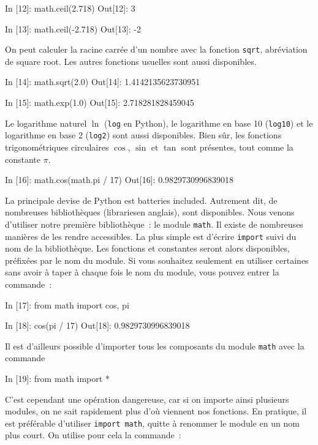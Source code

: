 \documentclass{magnolia}
\begin{document}
\begin{pythoncode}
In [12]: math.ceil(2.718)
Out[12]: 3

In [13]: math.ceil(-2.718)
Out[13]: -2
\end{pythoncode}

On peut calculer la racine carrée d'un nombre avec la fonction \verb_sqrt_,
abréviation de \og square root\fg. Les autres fonctions usuelles sont aussi disponibles.

\begin{pythoncode}
In [14]: math.sqrt(2.0)
Out[14]: 1.4142135623730951

In [15]: math.exp(1.0)
Out[15]: 2.718281828459045
\end{pythoncode}

\noindent Le logarithme naturel $\ln$ (\verb_log_ en Python), le logarithme en base 10 (\verb_log10_) et
le logarithme en base 2 (\verb_log2_) sont aussi disponibles. Bien sûr, les fonctions
trigonométriques circulaires $\cos$, $\sin$ et $\tan$ sont présentes, tout comme la
constante $\pi$.

\begin{pythoncode}
In [16]: math.cos(math.pi / 17)
Out[16]: 0.9829730996839018
\end{pythoncode}

La principale devise de Python est \og batteries included\fg. Autrement dit,
de nombreuses bibliothèques (\og libraries\fg en anglais), sont disponibles. Nous
venons d'utiliser notre première bibliothèque~: le module \verb_math_. Il existe de
nombreuses manières de les rendre accessibles. La plus simple est d'écrire \verb_import_
suivi du nom de la bibliothèque. Les fonctions et constantes seront alors disponibles,
préfixées par le nom du module. Si vous souhaitez seulement en utiliser certaines sans
avoir à taper à chaque fois le nom du module, vous pouvez entrer la commande~:

\begin{pythoncode}
In [17]: from math import cos, pi

In [18]: cos(pi / 17)
Out[18]: 0.9829730996839018
\end{pythoncode}

\noindent Il est d'ailleurs possible d'importer tous les composants du module \verb!math! avec la commande

\begin{pythoncode}
In [19]: from math import *
\end{pythoncode}

\noindent
C'est cependant une opération dangereuse, car si on importe ainsi plusieurs modules, on ne sait rapidement plus
d'où viennent nos fonctions. En pratique, il est préférable d'utiliser \verb!import math!, quitte
à renommer le module en un nom plus court. On utilise pour cela la commande~:
\end{document}

